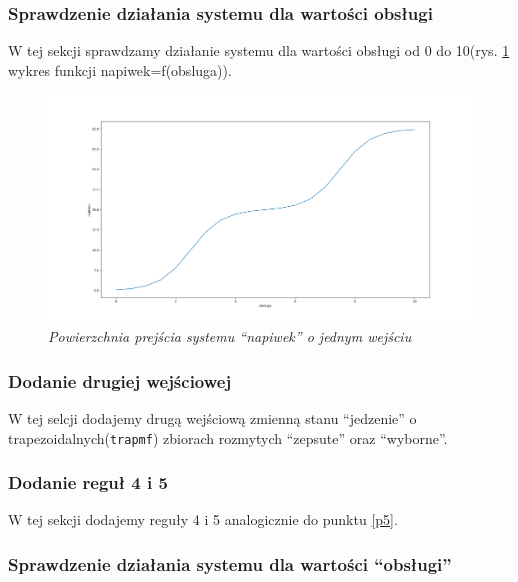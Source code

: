 \documentclass[a4paper, 10pt]{article}
\begin{document}
\subsubsection{Sprawdzenie działania systemu dla wartości obsługi}\label{p8}

W tej sekcji sprawdzamy działanie systemu dla wartości obsługi od 0 do 10(rys. \ref{fig:napiwek_obsluga} wykres funkcji napiwek=f(obsluga)).



\begin{figure}[H]
	\centering
	\includegraphics[scale=0.25]{Figure_5.png}
	\caption{\textit{Powierzchnia prejścia systemu ``napiwek'' o jednym wejściu}}
	\label{fig:napiwek_obsluga}
\end{figure}

\subsubsection{Dodanie drugiej wejściowej}\label{p9}
 
W tej selcji dodajemy drugą wejściową zmienną stanu ``jedzenie'' o trapezoidalnych(\verb|trapmf|) zbiorach rozmytych ``zepsute'' oraz ``wyborne''.



\subsubsection{Dodanie reguł 4 i 5}\label{p10}

W tej sekcji dodajemy reguły 4 i 5 analogicznie do punktu \ref{p5}.
\subsubsection{Sprawdzenie działania systemu dla wartości ``obsługi''}\label{p11}
\end{document}
